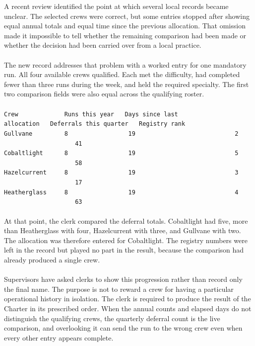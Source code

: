 \documentclass[9pt]{article}
\begin{document}
\begin{minipage}[t]{\textwidth}
\begin{minipage}[t]{0.49\textwidth}
\begin{exbox}
{  A recent review identified the point at which several local records became unclear. The selected crews were correct, but some entries stopped after showing equal annual totals and equal time since the previous allocation. That omission made it impossible to tell whether the remaining comparison had been made or whether the decision had been carried over from a local practice. \\
  \  \\
  The new record addresses that problem with a worked entry for one mandatory run. All four available crews qualified. Each met the difficulty, had completed fewer than three runs during the week, and held the required specialty. The first two comparison fields were also equal across the qualifying roster. \\
  \  \\
  \textup{\texttt{Crew~~~~~~~~~~~~~Runs this year~~~Days since last allocation~~~Deferrals this quarter~~~Registry rank}} \\
  \textup{\texttt{Gullvane~~~~~~~~~8~~~~~~~~~~~~~~~~~19~~~~~~~~~~~~~~~~~~~~~~~~~~~~2~~~~~~~~~~~~~~~~~~~~~~~~41}} \\
  \textup{\texttt{Cobaltlight~~~~~~8~~~~~~~~~~~~~~~~~19~~~~~~~~~~~~~~~~~~~~~~~~~~~~5~~~~~~~~~~~~~~~~~~~~~~~~58}} \\
  \textup{\texttt{Hazelcurrent~~~~~8~~~~~~~~~~~~~~~~~19~~~~~~~~~~~~~~~~~~~~~~~~~~~~3~~~~~~~~~~~~~~~~~~~~~~~~17}} \\
  \textup{\texttt{Heatherglass~~~~~8~~~~~~~~~~~~~~~~~19~~~~~~~~~~~~~~~~~~~~~~~~~~~~4~~~~~~~~~~~~~~~~~~~~~~~~63}} \\
  \  \\
  At that point, the clerk compared the deferral totals. Cobaltlight had five, more than Heatherglass with four, Hazelcurrent with three, and Gullvane with two. The allocation was therefore entered for Cobaltlight. The registry numbers were left in the record but played no part in the result, because the comparison had already produced a single crew. \\
  \  \\
  Supervisors have asked clerks to show this progression rather than record only the final name. The purpose is not to reward a crew for having a particular operational history in isolation. The clerk is required to produce the result of the Charter in its prescribed order. When the annual counts and elapsed days do not distinguish the qualifying crews, the quarterly deferral count is the live comparison, and overlooking it can send the run to the wrong crew even when every other entry appears complete. \\
}
\end{exbox}
\end{minipage}
\end{minipage}
\end{document}
